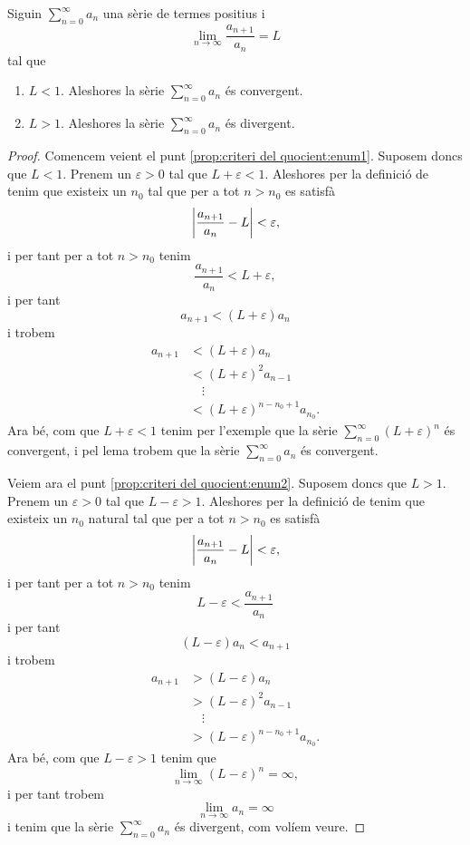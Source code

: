 \documentclass[../Apunts.tex]{subfiles}
\begin{document}
	\begin{proposition}
		\label{prop:criteri del quocient}
		Siguin \(\sum_{n=0}^{\infty}a_{n}\) una sèrie de termes positius i
		\[\lim_{n\to\infty}\frac{a_{n+1}}{a_{n}}=L\]
		tal que
		\begin{enumerate}
			\item\label{prop:criteri del quocient:enum1} \(L<1\). Aleshores la sèrie \(\sum_{n=0}^{\infty}a_{n}\) és convergent.
			\item\label{prop:criteri del quocient:enum2} \(L>1\). Aleshores la sèrie \(\sum_{n=0}^{\infty}a_{n}\) és divergent.
		\end{enumerate}
		\begin{proof}
			Comencem veient el punt \eqref{prop:criteri del quocient:enum1}. Suposem doncs que \(L<1\). Prenem un \(\varepsilon>0\) tal que \(L+\varepsilon<1\). Aleshores per la definició de  tenim que existeix un \(n_{0}\) tal que per a tot \(n>n_{0}\) es satisfà
			\[\abs{\frac{a_{n+1}}{a_{n}}-L}<\varepsilon,\]
			i per tant per a tot \(n>n_{0}\) tenim
			\[\frac{a_{n+1}}{a_{n}}<L+\varepsilon,\]
			i per tant
			\[a_{n+1}<(L+\varepsilon)a_{n}\]
			i trobem
			\begin{align*}
				a_{n+1}&<(L+\varepsilon)a_{n}\\
				&<(L+\varepsilon)^{2}a_{n-1}\\
				&\quad\vdots\\
				&<(L+\varepsilon)^{n-n_{0}+1}a_{n_{0}}.
			\end{align*}
			Ara bé, com que \(L+\varepsilon<1\) tenim per l'exemple  que la sèrie \(\sum_{n=0}^{\infty}(L+\varepsilon)^{n}\) és convergent, i pel lema  trobem que la sèrie \(\sum_{n=0}^{\infty}a_{n}\) és convergent.
			
			Veiem ara el punt \eqref{prop:criteri del quocient:enum2}. Suposem doncs que \(L>1\). Prenem un \(\varepsilon>0\) tal que \(L-\varepsilon>1\). Aleshores per la definició de  tenim que existeix un \(n_{0}\) natural tal que per a tot \(n>n_{0}\) es satisfà
			\[\abs{\frac{a_{n+1}}{a_{n}}-L}<\varepsilon,\]
			i per tant per a tot \(n>n_{0}\) tenim
			\[L-\varepsilon<\frac{a_{n+1}}{a_{n}}\]
			i per tant
			\[(L-\varepsilon)a_{n}<a_{n+1}\]
			i trobem
			\begin{align*}
				a_{n+1}&>(L-\varepsilon)a_{n}\\
				&>(L-\varepsilon)^{2}a_{n-1}\\
				&\quad\vdots\\
				&>(L-\varepsilon)^{n-n_{0}+1}a_{n_{0}}.
			\end{align*}
			Ara bé, com que \(L-\varepsilon>1\) tenim que
			\[\lim_{n\to\infty}(L-\varepsilon)^{n}=\infty,\]
			i per tant trobem
			\[\lim_{n\to\infty}a_{n}=\infty\]
			i tenim que la sèrie \(\sum_{n=0}^{\infty}a_{n}\) és divergent, com volíem veure.
		\end{proof}
	\end{proposition}
\end{document}
